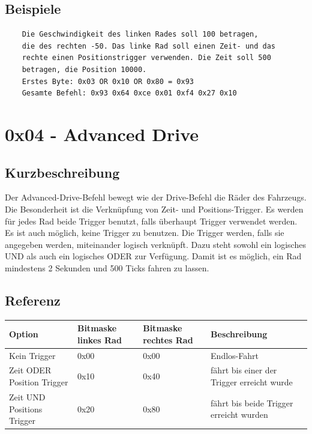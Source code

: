 \documentclass[a4paper]{article}
\begin{document}
	\subsection{Beispiele}

	\begin{verbatim}
	Die Geschwindigkeit des linken Rades soll 100 betragen,
	die des rechten -50. Das linke Rad soll einen Zeit- und das
	rechte einen Positionstrigger verwenden. Die Zeit soll 500
	betragen, die Position 10000.
	Erstes Byte: 0x03 OR 0x10 OR 0x80 = 0x93
	Gesamte Befehl: 0x93 0x64 0xce 0x01 0xf4 0x27 0x10
	\end{verbatim}
	\pagebreak


	\section{0x04 - Advanced Drive}

	\subsection{Kurzbeschreibung}

	Der Advanced-Drive-Befehl bewegt wie der Drive-Befehl die Räder des
	Fahrzeugs. Die Besonderheit ist die Verknüpfung von Zeit- und
	Positions-Trigger. Es werden für jedes Rad beide Trigger benutzt, falls
	überhaupt Trigger verwendet werden. Es ist auch möglich, keine Trigger
	zu benutzen. Die Trigger werden, falls sie angegeben werden, miteinander
	logisch verknüpft. Dazu steht sowohl ein logisches UND als auch ein
	logisches ODER zur Verfügung. Damit ist es möglich, ein Rad mindestens
	2 Sekunden und 500 Ticks fahren zu lassen.
	
	\subsection{Referenz}

	\begin{tabularx}{\linewidth}{|l|l|l|X|}
		\hline
		\textbf{Option} & \textbf{Bitmaske linkes Rad} & \textbf{Bitmaske rechtes Rad} & \textbf{Beschreibung} \\
		\hline
		\hline
		Kein Trigger				& 0x00						   & 0x00						   & Endlos-Fahrt \\
		\hline
		Zeit ODER Position Trigger	& 0x10						   & 0x40						   & fährt bis einer der Trigger erreicht wurde\\
		\hline
		Zeit UND Positions Trigger  & 0x20						   & 0x80						   & fährt bis beide Trigger erreicht wurden \\
		\hline
	\end{tabularx}
\end{document}
